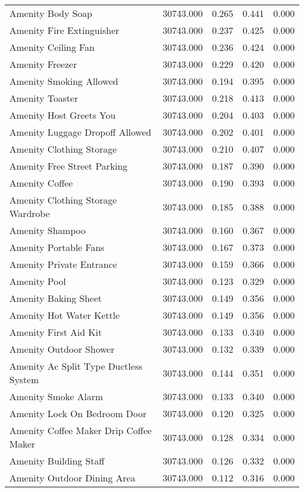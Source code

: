 \begin{tabular}{lllll}
Amenity Body Soap & 30743.000 & 0.265 & 0.441 & 0.000 \\
Amenity Fire Extinguisher & 30743.000 & 0.237 & 0.425 & 0.000 \\
Amenity Ceiling Fan & 30743.000 & 0.236 & 0.424 & 0.000 \\
Amenity Freezer & 30743.000 & 0.229 & 0.420 & 0.000 \\
Amenity Smoking Allowed & 30743.000 & 0.194 & 0.395 & 0.000 \\
Amenity Toaster & 30743.000 & 0.218 & 0.413 & 0.000 \\
Amenity Host Greets You & 30743.000 & 0.204 & 0.403 & 0.000 \\
Amenity Luggage Dropoff Allowed & 30743.000 & 0.202 & 0.401 & 0.000 \\
Amenity Clothing Storage & 30743.000 & 0.210 & 0.407 & 0.000 \\
Amenity Free Street Parking & 30743.000 & 0.187 & 0.390 & 0.000 \\
Amenity Coffee & 30743.000 & 0.190 & 0.393 & 0.000 \\
Amenity Clothing Storage Wardrobe & 30743.000 & 0.185 & 0.388 & 0.000 \\
Amenity Shampoo & 30743.000 & 0.160 & 0.367 & 0.000 \\
Amenity Portable Fans & 30743.000 & 0.167 & 0.373 & 0.000 \\
Amenity Private Entrance & 30743.000 & 0.159 & 0.366 & 0.000 \\
Amenity Pool & 30743.000 & 0.123 & 0.329 & 0.000 \\
Amenity Baking Sheet & 30743.000 & 0.149 & 0.356 & 0.000 \\
Amenity Hot Water Kettle & 30743.000 & 0.149 & 0.356 & 0.000 \\
Amenity First Aid Kit & 30743.000 & 0.133 & 0.340 & 0.000 \\
Amenity Outdoor Shower & 30743.000 & 0.132 & 0.339 & 0.000 \\
Amenity Ac   Split Type Ductless System & 30743.000 & 0.144 & 0.351 & 0.000 \\
Amenity Smoke Alarm & 30743.000 & 0.133 & 0.340 & 0.000 \\
Amenity Lock On Bedroom Door & 30743.000 & 0.120 & 0.325 & 0.000 \\
Amenity Coffee Maker Drip Coffee Maker & 30743.000 & 0.128 & 0.334 & 0.000 \\
Amenity Building Staff & 30743.000 & 0.126 & 0.332 & 0.000 \\
Amenity Outdoor Dining Area & 30743.000 & 0.112 & 0.316 & 0.000 \\

\end{tabular}
